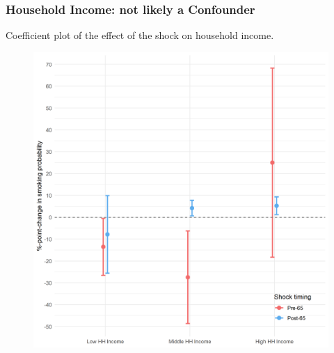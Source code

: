 \documentclass[10pt,compress,xcolor=dvipsnames,aspectratio=169]{beamer}    %
\newcounter{ex}
\newcommand{\1}[1]{\mathrm{1\hspace*{-2.5pt}l}[#1]}	%
\begin{document}
\begin{frame}
\frametitle{Household Income: not likely a Confounder}
Coefficient plot of the effect of the shock on household income.
\begin{figure}[hbtp]
\centering
\includegraphics[height=0.8\textheight]{../../3_output/shock_effects/hhinc_6070_100_cv.png}
\label{fig:hhinc}
\end{figure}
\end{frame}

%
\end{document}
